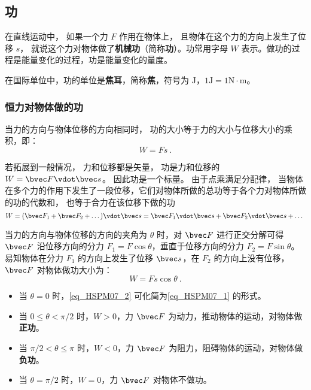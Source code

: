 

\subsection{功}

在直线运动中， 如果一个力 $F$ 作用在物体上， 且物体在这个力的方向上发生了位移 $s$， 就说这个力对物体做了\textbf{机械功}（简称\textbf{功}）。功常用字母 $W$ 表示。做功的过程是能量变化的过程，功是能量变化的量度。

在国际单位中，功的单位是\textbf{焦耳}，简称\textbf{焦}，符号为 $\mathrm{J}$，$1\mathrm{J}=1\mathrm{N \cdot m}$。

\subsubsection{恒力对物体做的功}

当力的方向与物体位移的方向相同时， 功的大小等于力的大小与位移大小的乘积，即：
\begin{equation}\label{eq_HSPM07_1}
W=Fs~.
\end{equation}

若拓展到一般情况， 力和位移都是矢量， 功是力和位移的 $W = \bvec F \vdot \bvec s$。 因此功是一个标量。 由于点乘满足分配律， 当物体在多个力的作用下发生了一段位移，它们对物体所做的总功等于各个力对物体所做的功的代数和， 也等于合力在该位移下做的功
\begin{equation}
W = (\bvec F_1 + \bvec F_2 + \dots)\vdot \bvec s = \bvec F_1 \vdot \bvec s + \bvec F_2 \vdot \bvec s + \dots~
\end{equation}

当力的方向与物体位移的方向的夹角为 $\theta$ 时，对 $\bvec F$ 进行正交分解可得 $\bvec F$ 沿位移方向的分力 $F_1=F\cos \theta$，垂直于位移方向的分力 $F_2=F\sin \theta$。易知物体在分力 $F_1$ 的方向上发生了位移 $\bvec s$，在 $F_2$ 的方向上没有位移，$\bvec F$ 对物体做功大小为：
\begin{equation}\label{eq_HSPM07_2}
W=Fs\cos \theta~.
\end{equation}

\begin{itemize}
\item 当 $\theta = 0$ 时，\autoref{eq_HSPM07_2} 可化简为\autoref{eq_HSPM07_1} 的形式。
\item 当 $0\leq \theta < \pi/2$ 时，$W>0$，力 $\bvec F$ 为动力，推动物体的运动，对物体做\textbf{正功}。
\item 当 $\pi/2< \theta \leq \pi$ 时，$W<0$，力 $\bvec F$ 为阻力，阻碍物体的运动，对物体做\textbf{负功}。
\item 当 $\theta = \pi/2$ 时，$W=0$，力 $\bvec F$ 对物体不做功。
\end{itemize}

